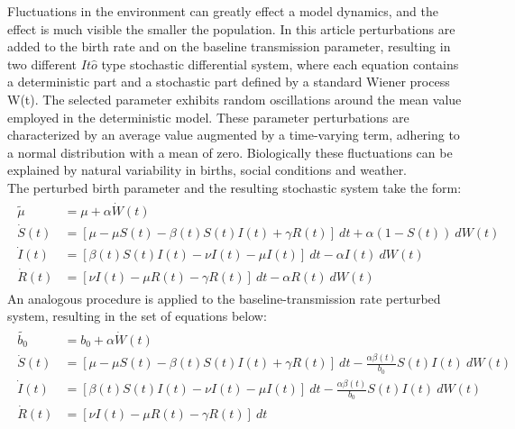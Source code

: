 Fluctuations in the environment can greatly effect a model dynamics, and the effect is much visible the smaller the population. In this article perturbations are added to the birth rate and on the baseline transmission parameter, resulting in two different $It \hat{o}$ type stochastic differential system, where each equation contains a deterministic part and a stochastic part defined by a standard Wiener process W(t). 
 The selected parameter exhibits random oscillations around the mean value employed in the deterministic model. These parameter perturbations are characterized by an average value augmented by a time-varying term, adhering to a normal distribution with a mean of zero.
Biologically these fluctuations can be explained by natural variability in births, social conditions and weather.\\
The perturbed birth parameter and the resulting stochastic system take the form:
 \begin{gather}
    \begin{aligned}
    \widetilde{\mu} &= \mu + \alpha \dot{W}(t) \\
    \dot{S}(t) &= [\mu - \mu S(t) - \beta (t) S(t) I(t) + \gamma R(t)] \ dt + \alpha (1-S(t)) \ dW(t) \\
    \dot{I}(t) &= [\beta (t) S(t) I(t) - \nu I(t) - \mu I(t)] \ dt - \alpha I(t) \ dW(t)  \\
    \dot{R}(t) &= [\nu I(t) - \mu R(t) - \gamma R(t)] \ dt - \alpha R(t) \ dW(t)
    \end{aligned}
 \label{eq:System2}
 \end{gather}
An analogous procedure is applied to the baseline-transmission rate perturbed system, resulting in the set of equations below:
 \begin{gather}
    \begin{aligned}
    \widetilde{b_{0}} &= b_{0} + \alpha \dot{W}(t) \\
    \dot{S}(t) &= [\mu - \mu S(t) - \beta (t) S(t) I(t) + \gamma R(t)] \ dt - \frac{\alpha \beta (t)}{b_{0}} S(t) I(t) \ dW(t) \\
    \dot{I}(t) &= [\beta (t) S(t) I(t) - \nu I(t) - \mu I(t)] \ dt - \frac{\alpha \beta (t)}{b_{0}} S(t) I(t) \ dW(t)  \\
    \dot{R}(t) &= [\nu I(t) - \mu R(t) - \gamma R(t)] \ dt 
    \end{aligned}
 \label{eq:System3}
 \end{gather}
